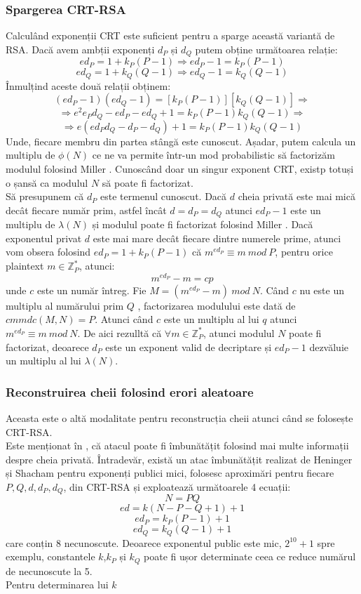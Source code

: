 \documentclass[12]{report}
\begin{document}
\subsubsection{Spargerea CRT-RSA}
Calculând exponenții CRT este suficient pentru a sparge această variantă de RSA. Dacă avem ambții exponenți $d_P$ și $d_Q$ putem obține următoarea relație:
$$ed_P = 1 + k_P(P-1) \Rightarrow ed_P -1 = k_P(P-1)$$
$$ed_Q = 1 + k_Q(Q-1) \Rightarrow ed_Q -1 =k_Q(Q-1)$$
Înmulțind aceste două relații obținem:
$$ (ed_P -1 ) (ed_Q -1) = [k_P(P-1)][k_Q(Q-1)] \Rightarrow $$
$$ \Rightarrow e^2e_Pd_Q - ed_P - ed_Q +1 = k_P(P-1)k_Q(Q-1) \Rightarrow$$
$$ \Rightarrow e(ed_Pd_Q - d_P -d_Q)+1 = k_P(P-1)k_Q(Q-1)$$
Unde, fiecare membru din partea stângă este cunoscut.  Așadar, putem calcula un multiplu de $\phi(N)$ ce ne va permite într-un mod probabilistic să factorizăm modulul folosind Miller \cite{miller}.
Cunoscând doar un singur exponent CRT, existp totuși o șansă ca modulul $N$ să poate fi factorizat.\\
Să presupunem că $d_P$ este termenul cunoscut. Dacă $d$ cheia privată este mai mică decât fiecare număr prim, astfel încât $d = d_P = d_Q$ atunci $ed_P-1$ este un multiplu de $\lambda(N)$ și modulul poate fi factorizat folosind Miller \cite{miller}. Dacă exponentul privat $d$ este mai mare decât fiecare dintre numerele prime, atunci vom obsera folosind $ed_P = 1 + k_P(P-1)$ că $m^{ed_P} \equiv m \ mod \ P$, pentru orice plaintext $m \in \mathbb{Z}_{P}^{*}$, atunci:
$$ m^{ed_P} - m = cp$$
unde $c$ este un număr întreg. Fie $M=(m^{ed_P} - m) \ mod \ N$. Când $c$ nu este un multiplu al numărului prim $Q$ , factorizarea modulului este dată de $cmmdc(M,N)=P$. Atunci când $c$ este un multiplu al lui $q$ atunci $m^{ed_P} \equiv m \ mod \ N$. De aici rezulltă că $\forall m \in \mathbb{Z}_{P}^{*}$, atunci modulul $N$ poate fi factorizat, deoarece $d_P$ este un exponent valid de decriptare și $ed_P-1$ dezvăluie un multiplu al lui $\lambda(N)$.
\subsubsection{Reconstruirea cheii folosind erori aleatoare}
Aceasta este o altă modalitate pentru reconstrucția cheii atunci când se folosește CRT-RSA.\\
Este menționat în \cite{95}, că atacul poate fi îmbunătățit folosind mai multe informații despre cheia privată. Întradevăr, există un atac îmbunătățit realizat de Heninger și Shacham \cite{heninger} pentru exponenți publici mici, folosesc aproximări pentru fiecare $P,Q,d,d_P,d_Q$, din CRT-RSA și exploatează următoarele 4 ecuații:
$$ N=PQ $$
$$ ed=k(N-P-Q+1)+1$$
$$ ed_P=k_P(P-1)+1$$
$$ ed_Q=k_Q(Q-1)+1$$
care conțin 8 necunoscute. Deoarece exponentul public este mic, $2^10+1$ spre exemplu, constantele $k$,$k_P$ și $k_Q$ poate fi ușor determinate ceea ce reduce numărul de necunoscute la 5.\\
Pentru determinarea lui $k$ 
\end{document}
